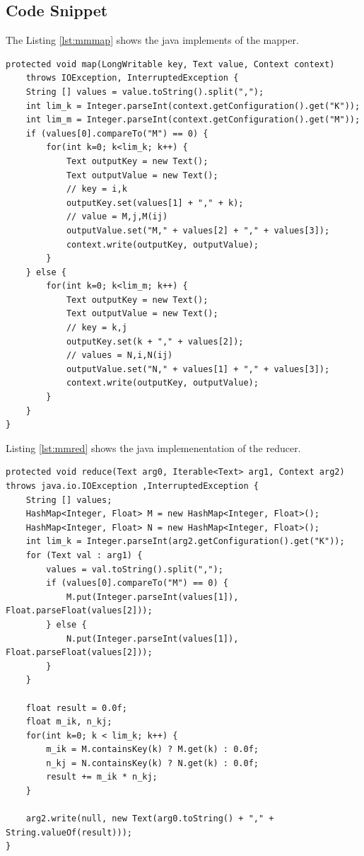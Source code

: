 \documentclass{article}
\begin{document}
\subsection{Code Snippet}

The Listing \ref{lst:mmmap} shows the java implements of the mapper.

\begin{lstlisting}[caption={Matrix multiplication mapper code snippet},label={lst:mmmap},style=MyJavaStyle]
protected void map(LongWritable key, Text value, Context context)
	throws IOException, InterruptedException {
	String [] values = value.toString().split(",");
	int lim_k = Integer.parseInt(context.getConfiguration().get("K"));
	int lim_m = Integer.parseInt(context.getConfiguration().get("M"));
	if (values[0].compareTo("M") == 0) {
		for(int k=0; k<lim_k; k++) {
			Text outputKey = new Text();
			Text outputValue = new Text();
			// key = i,k
			outputKey.set(values[1] + "," + k);
			// value = M,j,M(ij)
			outputValue.set("M," + values[2] + "," + values[3]);
			context.write(outputKey, outputValue);
		}
	} else {
		for(int k=0; k<lim_m; k++) {
			Text outputKey = new Text();
			Text outputValue = new Text();
			// key = k,j
			outputKey.set(k + "," + values[2]);
			// values = N,i,N(ij)
			outputValue.set("N," + values[1] + "," + values[3]);
			context.write(outputKey, outputValue);
		}
	}
}
\end{lstlisting}

Listing \ref{lst:mmred} shows the java implemenentation of the reducer.

\begin{lstlisting}[caption={Matrix multiplication reducer code snippet},label={lst:mmred},style=MyJavaStyle]
protected void reduce(Text arg0, Iterable<Text> arg1, Context arg2) throws java.io.IOException ,InterruptedException {
    String [] values;
    HashMap<Integer, Float> M = new HashMap<Integer, Float>();
    HashMap<Integer, Float> N = new HashMap<Integer, Float>();
    int lim_k = Integer.parseInt(arg2.getConfiguration().get("K"));
    for (Text val : arg1) {
        values = val.toString().split(",");
        if (values[0].compareTo("M") == 0) {
            M.put(Integer.parseInt(values[1]), Float.parseFloat(values[2]));
        } else {
            N.put(Integer.parseInt(values[1]), Float.parseFloat(values[2]));
        }
    }

    float result = 0.0f;
    float m_ik, n_kj;
    for(int k=0; k < lim_k; k++) {
        m_ik = M.containsKey(k) ? M.get(k) : 0.0f;
        n_kj = N.containsKey(k) ? N.get(k) : 0.0f;
        result += m_ik * n_kj;
    }

    arg2.write(null, new Text(arg0.toString() + "," + String.valueOf(result)));
}
\end{lstlisting}
\end{document}
